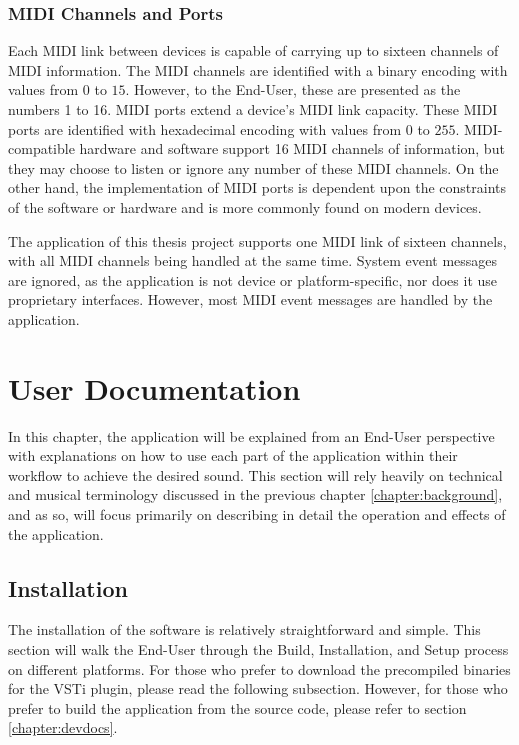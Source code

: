 \documentclass[a4paper,12pt]{report}
\begin{document}
\subsection{MIDI Channels and Ports}
\label{subsec:midichannelports}
Each MIDI link between devices is capable of carrying up to sixteen channels of MIDI information. The MIDI channels are identified with a binary encoding with values from $0$ to $15$. However, to the End-User, these are presented as the numbers 1 to 16. MIDI ports extend a device's MIDI link capacity. These MIDI ports are identified with hexadecimal encoding with values from $0$ to $255$. MIDI-compatible hardware and software support 16 MIDI channels of information, but they may choose to listen or ignore any number of these MIDI channels. On the other hand, the implementation of MIDI ports is dependent upon the constraints of the software or hardware and is more commonly found on modern devices.

The application of this thesis project supports one MIDI link of sixteen channels, with all MIDI channels being handled at the same time. System event messages are ignored, as the application is not device or platform-specific, nor does it use proprietary interfaces. However, most MIDI event messages are handled by the application.


\chapter{User Documentation}
\label{chapter:userdoc}
In this chapter, the application will be explained from an End-User perspective with explanations on how to use each part of the application within their workflow to achieve the desired sound. This section will rely heavily on technical and musical terminology discussed in the previous chapter \ref{chapter:background}, and as so, will focus primarily on describing in detail the operation and effects of the application.

\section{Installation}
\label{sec:installation}
The installation of the software is relatively straightforward and simple. This section will walk the End-User through the Build, Installation, and Setup process on different platforms. For those who prefer to download the precompiled binaries for the VSTi plugin, please read the following subsection. However, for those who prefer to build the application from the source code, please refer to section \ref{chapter:devdocs}.
\end{document}
